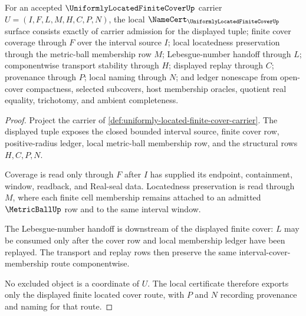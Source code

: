 \begin{theorem}
\label{thm:uniformly-located-finite-cover-namecert-obligations}
For an accepted $\UniformlyLocatedFiniteCoverUp$ carrier $U=(I,F,L,M,H,C,P,N)$, the local $\NameCert_{\UniformlyLocatedFiniteCoverUp}$ surface consists exactly of carrier admission for the displayed tuple; finite cover coverage through $F$ over the interval source $I$; local locatedness preservation through the metric-ball membership row $M$; Lebesgue-number handoff through $L$; componentwise transport stability through $H$; displayed replay through $C$; provenance through $P$; local naming through $N$; and ledger nonescape from open-cover compactness, selected subcovers, host membership oracles, quotient real equality, trichotomy, and ambient completeness.
\end{theorem}
\begin{proof}
Project the carrier of \autoref{def:uniformly-located-finite-cover-carrier}. The displayed tuple exposes the closed bounded interval source, finite cover row, positive-radius ledger, local metric-ball membership row, and the structural rows $H,C,P,N$.

Coverage is read only through $F$ after $I$ has supplied its endpoint, containment, window, readback, and Real-seal data. Locatedness preservation is read through $M$, where each finite cell membership remains attached to an admitted $\MetricBallUp$ row and to the same interval window.

The Lebesgue-number handoff is downstream of the displayed finite cover: $L$ may be consumed only after the cover row and local membership ledger have been replayed. The transport and replay rows then preserve the same interval-cover-membership route componentwise.

No excluded object is a coordinate of $U$. The local certificate therefore exports only the displayed finite located cover route, with $P$ and $N$ recording provenance and naming for that route.
\end{proof}

